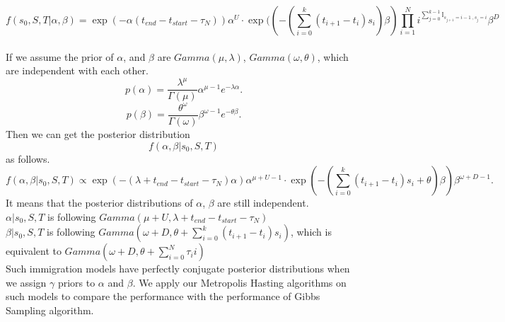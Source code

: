 $$f(s_0,S,T| \alpha, \beta) = \exp(-\alpha(t_{end} - t_{start}- \tau_N) )\alpha^U \cdot  \exp((-(\sum_{i=0}^k (t_{i+1} - t_i)s_i)\beta) \prod_{i=1}^N i^{\sum_{j=0}^{k-1}\mathbb{I}_{s_{j+1} = i -1 \;,  s_j = i} }   \beta^D$$\\
If we assume the prior of $\alpha$, and $\beta$ are $Gamma(\mu,\lambda)$, $Gamma(\omega, \theta)$, which are independent with each other. \\
$$p(\alpha) = \frac{\lambda^\mu}{\Gamma(\mu)}\alpha^{\mu -1}e^{-\lambda \alpha}. $$
$$p(\beta) = \frac{\theta^\omega}{\Gamma(\omega)}\beta^{\omega -1}e^{-\theta \beta}. $$
Then we can get the posterior distribution $$f(\alpha, \beta | s_0,S,T)$$ as follows.
$$ f(\alpha, \beta | s_0,S,T) \propto \exp(-(\lambda + t_{end} - t_{start}- \tau_N)\alpha) \alpha^{\mu + U -1} \cdot \exp(-(\sum_{i=0}^k (t_{i+1} - t_i)s_i + \theta)\beta) \beta^{\omega+ D -1}.$$
It means that the posterior distributions of $\alpha$, $\beta$ are still independent. \\
$\alpha | s_0,S,T$ is following $Gamma(\mu+ U,\lambda + t_{end} - t_{start}- \tau_N)$\\
$\beta | s_0,S,T$ is following $Gamma(\omega+ D,\theta + \sum_{i=0}^k (t_{i+1} - t_i)s_i)$, which is equivalent to $Gamma(\omega+ D,\theta +\sum_{i=0}^N \tau_ii)$\\
Such immigration models have perfectly conjugate posterior distributions when we assign $\gamma$ priors to $\alpha$ and $\beta$. We apply our Metropolis Hasting algorithms on such models to compare the performance with the performance of Gibbs Sampling algorithm.
